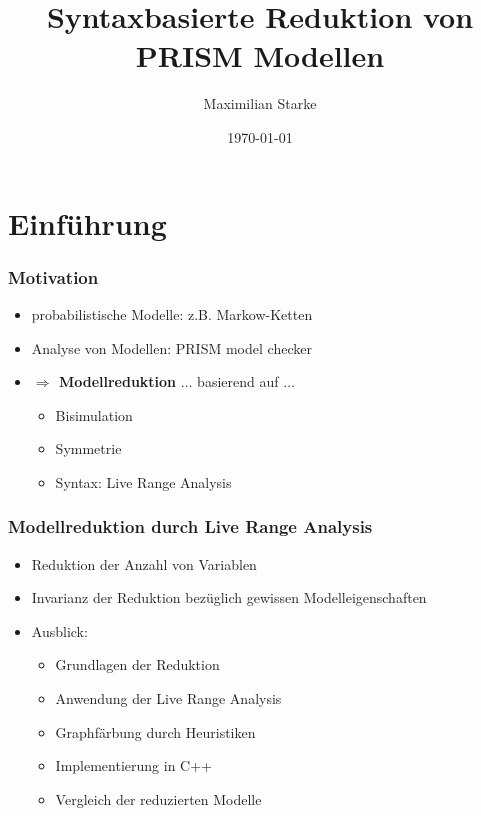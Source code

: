 \documentclass[onlymath]{beamer}
\title{Syntaxbasierte Reduktion von PRISM Modellen}
\author{Maximilian Starke}
\institute[VFU] %
{
	\inst{}%
	Fakultät für Informatik\\
	Technische Universität Dresden
}
\date{\today}
\newcommand{\mc}{Markow-Kette}
\begin{document}
	

\frame{\titlepage}



\section{Einführung}



\begin{frame}
	\frametitle{Motivation}
	\begin{itemize}
		\item probabilistische Modelle: z.B. \mc{}n
		\item Analyse von Modellen: PRISM model checker \pause
		\item \textbf{$\Rightarrow$ Modellreduktion} \pause $\dots$ basierend auf $\dots$ \begin{itemize}
			\item Bisimulation
			\item Symmetrie \pause
			\item Syntax: Live Range Analysis
		\end{itemize}
	\end{itemize}
\end{frame}



\begin{frame}
	\frametitle{Modellreduktion durch Live Range Analysis}
	\begin{itemize}
		\item Reduktion der Anzahl von Variablen \pause
		\item Invarianz der Reduktion bezüglich gewissen Modelleigenschaften \pause
		\item Ausblick: \begin{itemize}
			\item Grundlagen der Reduktion \pause
			\item Anwendung der Live Range Analysis \pause
			\item Graphfärbung durch Heuristiken \pause
			\item Implementierung in C++ 
			\item Vergleich der reduzierten Modelle
			
		\end{itemize}
	\end{itemize}
\end{frame}
\end{document}
